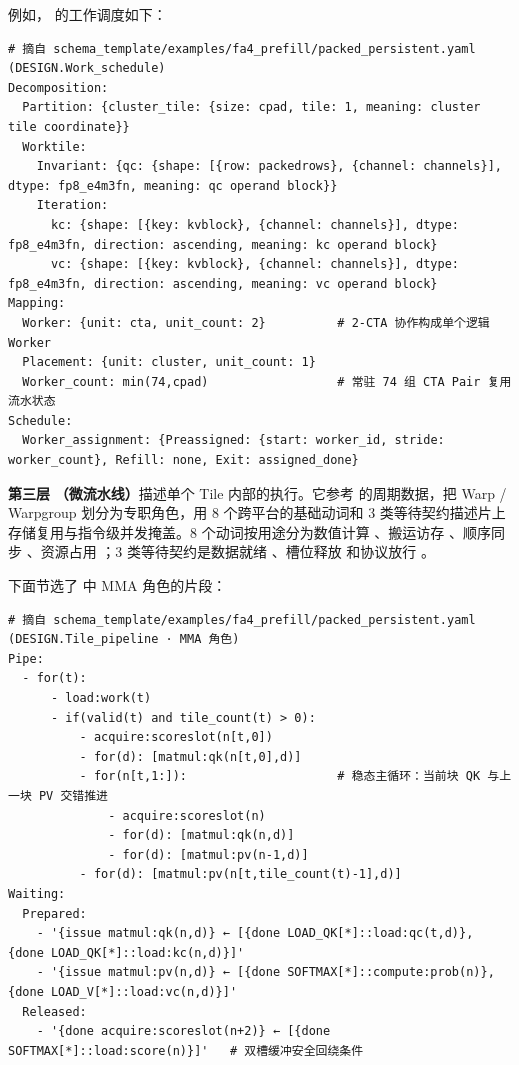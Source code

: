 例如， 的工作调度如下：
\begin{CodeBox}
\begin{Verbatim}[breaklines,breakanywhere,breaksymbolleft={},breaksymbolright={},breakautoindent=true]
# 摘自 schema_template/examples/fa4_prefill/packed_persistent.yaml (DESIGN.Work_schedule)
Decomposition:
  Partition: {cluster_tile: {size: cpad, tile: 1, meaning: cluster tile coordinate}}
  Worktile:
    Invariant: {qc: {shape: [{row: packedrows}, {channel: channels}], dtype: fp8_e4m3fn, meaning: qc operand block}}
    Iteration:
      kc: {shape: [{key: kvblock}, {channel: channels}], dtype: fp8_e4m3fn, direction: ascending, meaning: kc operand block}
      vc: {shape: [{key: kvblock}, {channel: channels}], dtype: fp8_e4m3fn, direction: ascending, meaning: vc operand block}
Mapping:
  Worker: {unit: cta, unit_count: 2}          # 2-CTA 协作构成单个逻辑 Worker
  Placement: {unit: cluster, unit_count: 1}
  Worker_count: min(74,cpad)                  # 常驻 74 组 CTA Pair 复用流水状态
Schedule:
  Worker_assignment: {Preassigned: {start: worker_id, stride: worker_count}, Refill: none, Exit: assigned_done}
\end{Verbatim}
\end{CodeBox}

\textbf{第三层} \textbf{（微流水线）}描述单个 Tile 内部的执行。它参考  的周期数据，把 Warp / Warpgroup 划分为专职角色，用 8 个跨平台的基础动词和 3 类等待契约描述片上存储复用与指令级并发掩盖。8 个动词按用途分为数值计算 、搬运访存 、顺序同步 、资源占用 ；3 类等待契约是数据就绪 、槽位释放  和协议放行 。

下面节选了  中 MMA 角色的片段：
\begin{CodeBox}
\begin{Verbatim}[breaklines,breakanywhere,breaksymbolleft={},breaksymbolright={},breakautoindent=true]
# 摘自 schema_template/examples/fa4_prefill/packed_persistent.yaml (DESIGN.Tile_pipeline · MMA 角色)
Pipe:
  - for(t):
      - load:work(t)
      - if(valid(t) and tile_count(t) > 0):
          - acquire:scoreslot(n[t,0])
          - for(d): [matmul:qk(n[t,0],d)]
          - for(n[t,1:]):                     # 稳态主循环：当前块 QK 与上一块 PV 交错推进
              - acquire:scoreslot(n)
              - for(d): [matmul:qk(n,d)]
              - for(d): [matmul:pv(n-1,d)]
          - for(d): [matmul:pv(n[t,tile_count(t)-1],d)]
Waiting:
  Prepared:
    - '{issue matmul:qk(n,d)} ← [{done LOAD_QK[*]::load:qc(t,d)}, {done LOAD_QK[*]::load:kc(n,d)}]'
    - '{issue matmul:pv(n,d)} ← [{done SOFTMAX[*]::compute:prob(n)}, {done LOAD_V[*]::load:vc(n,d)}]'
  Released:
    - '{done acquire:scoreslot(n+2)} ← [{done SOFTMAX[*]::load:score(n)}]'   # 双槽缓冲安全回绕条件
\end{Verbatim}
\end{CodeBox}

